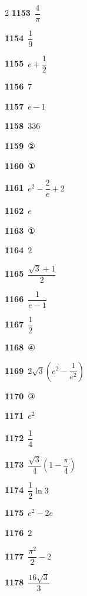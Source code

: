 \documentclass[10pt,a4paper]{article}
\begin{document}
\begin{multicols}{2}
\noindent\textbf{1153}\ $\dfrac{4}{\pi}$\par
\noindent\textbf{1154}\ $\dfrac{1}{9}$\par
\noindent\textbf{1155}\ $e+\dfrac{1}{2}$\par
\noindent\textbf{1156}\ $7$\par
\noindent\textbf{1157}\ $e-1$\par
\noindent\textbf{1158}\ $336$\par
\noindent\textbf{1159}\ ②\par
\noindent\textbf{1160}\ ①\par
\noindent\textbf{1161}\ $e^2-\dfrac{2}{e}+2$\par
\noindent\textbf{1162}\ $e$\par
\noindent\textbf{1163}\ ①\par
\noindent\textbf{1164}\ $2$\par
\noindent\textbf{1165}\ $\dfrac{\sqrt{3}+1}{2}$\par
\noindent\textbf{1166}\ $\dfrac{1}{e-1}$\par
\noindent\textbf{1167}\ $\dfrac{1}{2}$\par
\noindent\textbf{1168}\ ④\par
\noindent\textbf{1169}\ $2\sqrt{3}\left(e^2-\dfrac{1}{e^2}\right)$\par
\noindent\textbf{1170}\ ③\par
\noindent\textbf{1171}\ $e^2$\par
\noindent\textbf{1172}\ $\dfrac{1}{4}$\par
\noindent\textbf{1173}\ $\dfrac{\sqrt{3}}{4}\left(1-\dfrac{\pi}{4}\right)$\par
\noindent\textbf{1174}\ $\dfrac{1}{2}\ln 3$\par
\noindent\textbf{1175}\ $e^2-2e$\par
\noindent\textbf{1176}\ $2$\par
\noindent\textbf{1177}\ $\dfrac{\pi^2}{2}-2$\par
\noindent\textbf{1178}\ $\dfrac{16\sqrt{3}}{3}$\par
\end{multicols}
\end{document}
